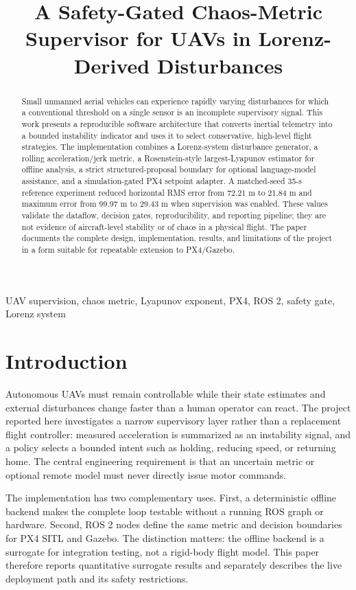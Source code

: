\documentclass[10pt,conference]{IEEEtran}
\title{A Safety-Gated Chaos-Metric Supervisor for UAVs in
Lorenz-Derived Disturbances}
\author{\IEEEauthorblockN{UAV Chaos Supervisor Research Workstream}
\IEEEauthorblockA{Reproducible software and simulation study}}
\begin{document}
\maketitle

\begin{abstract}
Small unmanned aerial vehicles can experience rapidly varying disturbances for
which a conventional threshold on a single sensor is an incomplete supervisory
signal. This work presents a reproducible software architecture that converts
inertial telemetry into a bounded instability indicator and uses it to select
conservative, high-level flight strategies. The implementation combines a
Lorenz-system disturbance generator, a rolling acceleration/jerk metric, a
Rosenstein-style largest-Lyapunov estimator for offline analysis, a strict
structured-proposal boundary for optional language-model assistance, and a
simulation-gated PX4 setpoint adapter. A matched-seed 35-s reference experiment
reduced horizontal RMS error from 72.21 m to 21.84 m and maximum error from
99.97 m to 29.43 m when supervision was enabled. These values validate the
dataflow, decision gates, reproducibility, and reporting pipeline; they are not
evidence of aircraft-level stability or of chaos in a physical flight. The
paper documents the complete design, implementation, results, and limitations
of the project in a form suitable for repeatable extension to PX4/Gazebo.
\end{abstract}

\begin{IEEEkeywords}
UAV supervision, chaos metric, Lyapunov exponent, PX4, ROS 2, safety gate,
Lorenz system
\end{IEEEkeywords}

\section{Introduction}
Autonomous UAVs must remain controllable while their state estimates and
external disturbances change faster than a human operator can react. The
project reported here investigates a narrow supervisory layer rather than a
replacement flight controller: measured acceleration is summarized as an
instability signal, and a policy selects a bounded intent such as holding,
reducing speed, or returning home. The central engineering requirement is that
an uncertain metric or optional remote model must never directly issue motor
commands.

The implementation has two complementary uses. First, a deterministic offline
backend makes the complete loop testable without a running ROS graph or
hardware. Second, ROS 2 nodes define the same metric and decision boundaries
for PX4 SITL and Gazebo. The distinction matters: the offline backend is a
surrogate for integration testing, not a rigid-body flight model. This paper
therefore reports quantitative surrogate results and separately describes the
live deployment path and its safety restrictions.
\end{document}
